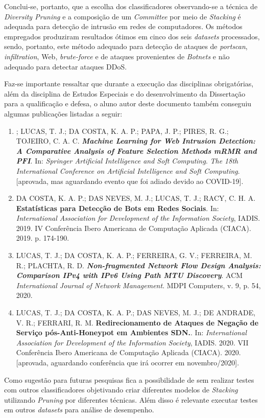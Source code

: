 Conclui-se, portanto, que a escolha dos classificadores observando-se a técnica de \textit{Diversity Pruning} e a composição de um \textit{Committee} por meio de \textit{Stacking} é adequada para detecção de intrusão em redes de computadores. Os métodos empregados produziram resultados ótimos em cinco dos seis \textit{datasets} processados, sendo, portanto, este método adequado para detecção de ataques de \textit{portscan}, \textit{infiltration}, Web,  \textit{brute-force} e de ataques provenientes de \textit{Botnets} e não adequado para detectar ataques DDoS. 

Faz-se importante ressaltar que durante a execução das disciplinas obrigatórias, além da disciplina de Estudos Especiais e do desenvolvimento da Dissertação para a qualificação e defesa, o aluno autor deste documento também conseguiu algumas publicações listadas a seguir:

\begin{enumerate}
 
 
     \item ; LUCAS, T. J.; DA COSTA, K. A. P.; PAPA, J. P.; PIRES, R. G.; TOJEIRO, C. A. C. \textit{\textbf{Machine Learning for Web Intrusion Detection: A Comparative Analysis of Feature Selection Methods mRMR and PFI}}. In: \textit{Springer Artificial Intelligence and Soft Computing}. \textit{The 18th International Conference on Artificial Intelligence and Soft Computing}. [aprovada, mas aguardando evento que foi adiado devido ao COVID-19].
 
    \item DA COSTA, K. A. P.; DAS NEVES, M. J.; LUCAS, T. J.; RACY, C. H. A. \textbf{Estatísticas para Detecção de Bots em Redes Sociais}. In: \textit{International Association for Development of the Information Society}, IADIS. 2019. IV Conferência Ibero Americana de Computação Aplicada (CIACA). 2019. p. 174-190.
    

    
    \item LUCAS, T. J.; DA COSTA, K. A. P.; FERREIRA, G. V.; FERREIRA, M. R.; PLACHTA, R. D. \textit{\textbf{Non-fragmented Network Flow Design Analysis: Comparison IPv4 with IPv6 Using Path MTU Discovery}}. ACM \textit{International Journal of Network Management}. MDPI Computers, v. 9, p. 54, 2020.
    
    
    \item LUCAS, T. J.; DA COSTA, K. A. P.; DAS NEVES, M. J.; DE ANDRADE, V. R.; FERRARI, R. M. \textbf{Redirecionamento de Ataques de Negação de Serviço pós-Anti-Honeypot em Ambientes SDN.}. In: \textit{International Association for Development of the Information Society}, IADIS. 2020. VII Conferência Ibero Americana de Computação Aplicada (CIACA). 2020. [aprovada, aguardando conferência que irá ocorrer em novembro/2020].

    
\end{enumerate}

Como sugestão para futuras pesquisas fica a possibilidade de sem realizar testes com outros classificadores objetivando criar diferentes modelos de \textit{Stacking} utilizando \textit{Pruning} por diferentes técnicas. Além disso é relevante executar testes em outros \textit{datasets} para análise de desempenho.
